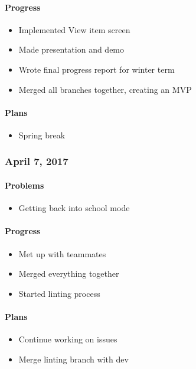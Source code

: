 \paragraph{Progress}\label{progress}
\begin{itemize}
\tightlist
\item
  Implemented View item screen
\item
  Made presentation and demo
\item
  Wrote final progress report for winter term
\item
  Merged all branches together, creating an MVP
\end{itemize}
\paragraph{Plans}\label{plans}
\begin{itemize}
\tightlist
\item
  Spring break
\end{itemize}

\subsubsection{April 7, 2017}\label{section}
\paragraph{Problems}\label{problems}
\begin{itemize}
\tightlist
\item
  Getting back into school mode
\end{itemize}
\paragraph{Progress}\label{progress}
\begin{itemize}
\tightlist
\item
  Met up with teammates
\item
  Merged everything together
\item
  Started linting process
\end{itemize}
\paragraph{Plans}\label{plans}
\begin{itemize}
\tightlist
\item
  Continue working on issues
\item
  Merge linting branch with dev
\end{itemize}

